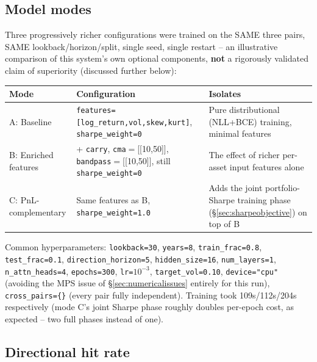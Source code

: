 \documentclass[11pt]{article}
\newcommand{\code}[1]{\texttt{\small #1}}
\begin{document}
\subsection{Model modes}

Three progressively richer configurations were trained on the SAME three pairs, SAME
lookback/horizon/split, single seed, single restart -- an illustrative comparison of this
system's own optional components, \textbf{not} a rigorously validated claim of superiority
(discussed further below):

\begin{center}
\renewcommand{\arraystretch}{1.25}
\small
\begin{tabular}{@{}p{2.6cm}p{7.0cm}p{5.0cm}@{}}
\toprule
\textbf{Mode} & \textbf{Configuration} & \textbf{Isolates} \\
\midrule
A: Baseline & \code{features=[log\_return,vol,skew,kurt]}, \code{sharpe\_weight=0} & Pure distributional (NLL+BCE) training, minimal features \\
B: Enriched features & + \code{carry}, \code{cma}$=$[[10,50]], \code{bandpass}$=$[[10,50]], still \code{sharpe\_weight=0} & The effect of richer per-asset input features alone \\
C: PnL-complementary & Same features as B, \code{sharpe\_weight=1.0} & Adds the joint portfolio-Sharpe training phase (\S\ref{sec:sharpeobjective}) on top of B \\
\bottomrule
\end{tabular}
\end{center}

Common hyperparameters: \code{lookback=30}, \code{years=8}, \code{train\_frac=0.8},
\code{test\_frac=0.1}, \code{direction\_horizon=5}, \code{hidden\_size=16},
\code{num\_layers=1}, \code{n\_attn\_heads=4}, \code{epochs=300}, \code{lr=}$10^{-3}$,
\code{target\_vol=0.10}, \code{device="cpu"} (avoiding the MPS issue of
\S\ref{sec:numericalissues} entirely for this run), \code{cross\_pairs=\{\}} (every pair
fully independent). Training took 109s/112s/204s respectively (mode C's joint Sharpe phase
roughly doubles per-epoch cost, as expected -- two full phases instead of one).

\subsection{Directional hit rate}
\end{document}

